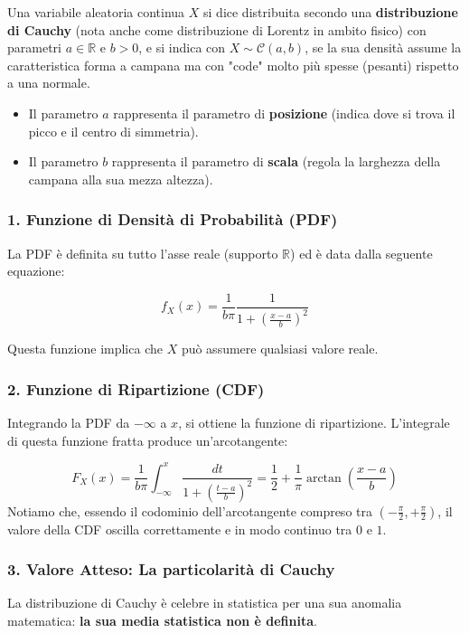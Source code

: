 Una variabile aleatoria continua $X$ si dice distribuita secondo una \textbf{distribuzione di Cauchy} (nota anche come distribuzione di Lorentz in ambito fisico) con parametri $a \in \mathbb{R}$ e $b > 0$, e si indica con $X \sim \mathcal{C}(a, b)$, se la sua densità assume la caratteristica forma a campana ma con "code" molto più spesse (pesanti) rispetto a una normale.

\begin{itemize}
    \item Il parametro $a$ rappresenta il parametro di \textbf{posizione} (indica dove si trova il picco e il centro di simmetria).
    \item Il parametro $b$ rappresenta il parametro di \textbf{scala} (regola la larghezza della campana alla sua mezza altezza).
\end{itemize}

\subsubsection{1. Funzione di Densità di Probabilità (PDF)}
La PDF è definita su tutto l'asse reale (supporto $\mathbb{R}$) ed è data dalla seguente equazione:

\begin{equation}
f_X(x) = \frac{1}{b\pi} \frac{1}{1 + \left(\frac{x-a}{b}\right)^2}
\end{equation}

Questa funzione implica che $X$ può assumere qualsiasi valore reale.

\subsubsection{2. Funzione di Ripartizione (CDF)}
Integrando la PDF da $-\infty$ a $x$, si ottiene la funzione di ripartizione. L'integrale di questa funzione fratta produce un'arcotangente:

\begin{equation}
F_X(x) = \frac{1}{b\pi} \int_{-\infty}^{x} \frac{dt}{1 + \left(\frac{t-a}{b}\right)^2} = \frac{1}{2} + \frac{1}{\pi} \arctan\left(\frac{x - a}{b}\right)
\end{equation}
Notiamo che, essendo il codominio dell'arcotangente compreso tra $(-\frac{\pi}{2}, +\frac{\pi}{2})$, il valore della CDF oscilla correttamente e in modo continuo tra $0$ e $1$.

\subsubsection{3. Valore Atteso: La particolarità di Cauchy}
La distribuzione di Cauchy è celebre in statistica per una sua anomalia matematica: \textbf{la sua media statistica non è definita}. 

